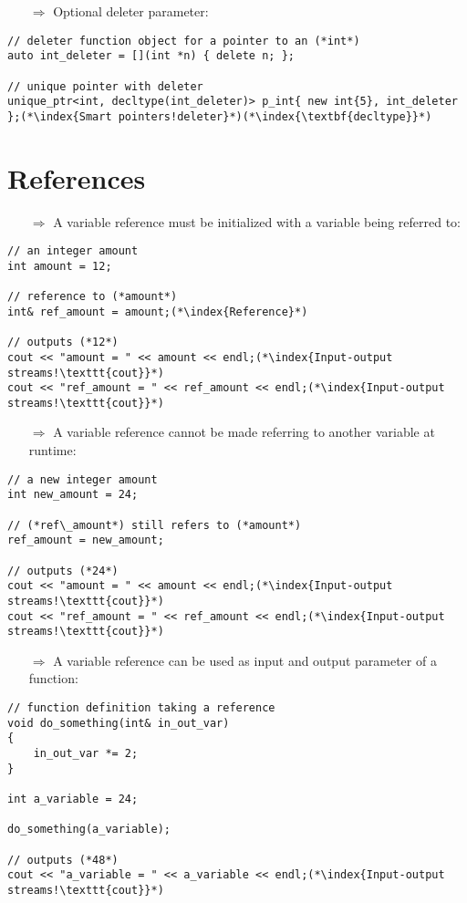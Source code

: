 \documentclass[10pt]{article}
\begin{document}
\begin{enumerate}
\item[$\Rightarrow$] Optional deleter parameter:
\end{enumerate}
\begin{lstlisting}
// deleter function object for a pointer to an (*int*)
auto int_deleter = [](int *n) { delete n; };

// unique pointer with deleter
unique_ptr<int, decltype(int_deleter)> p_int{ new int{5}, int_deleter };(*\index{Smart pointers!deleter}*)(*\index{\textbf{decltype}}*)
\end{lstlisting}
%
%
\section{References}
\small
\begin{enumerate}
\item[$\Rightarrow$] A variable reference must be initialized with a variable being referred to:
\end{enumerate}
\begin{lstlisting}
// an integer amount
int amount = 12;

// reference to (*amount*)
int& ref_amount = amount;(*\index{Reference}*)

// outputs (*12*)
cout << "amount = " << amount << endl;(*\index{Input-output streams!\texttt{cout}}*)
cout << "ref_amount = " << ref_amount << endl;(*\index{Input-output streams!\texttt{cout}}*)
\end{lstlisting}
\begin{enumerate}
\item[$\Rightarrow$] A variable reference cannot be made referring to another variable at runtime:
\end{enumerate}
\begin{lstlisting}
// a new integer amount
int new_amount = 24;

// (*ref\_amount*) still refers to (*amount*)
ref_amount = new_amount;

// outputs (*24*)
cout << "amount = " << amount << endl;(*\index{Input-output streams!\texttt{cout}}*)
cout << "ref_amount = " << ref_amount << endl;(*\index{Input-output streams!\texttt{cout}}*)
\end{lstlisting}
\begin{enumerate}
\item[$\Rightarrow$] A variable reference can be used as input and output parameter of a function:
\end{enumerate}
\begin{lstlisting}
// function definition taking a reference
void do_something(int& in_out_var)
{
    in_out_var *= 2;
}

int a_variable = 24;

do_something(a_variable);

// outputs (*48*)
cout << "a_variable = " << a_variable << endl;(*\index{Input-output streams!\texttt{cout}}*)
\end{lstlisting}
%
%
\end{document}
